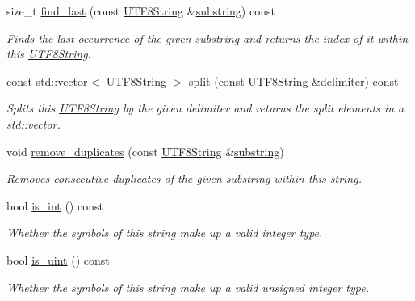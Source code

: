\begin{DoxyCompactItemize}
size\-\_\-t \hyperlink{classchaos_1_1uni_1_1_u_t_f8_string_a339b29461067299eebef2cd2a71278ee}{find\-\_\-last} (const \hyperlink{classchaos_1_1uni_1_1_u_t_f8_string}{U\-T\-F8\-String} \&\hyperlink{classchaos_1_1uni_1_1_u_t_f8_string_abfc2bac44a9be97d0d27e7b245a7df6e}{substring}) const 
\begin{DoxyCompactList}\small\item\em Finds the last occurrence of the given substring and returns the index of it within this \hyperlink{classchaos_1_1uni_1_1_u_t_f8_string}{U\-T\-F8\-String}. \end{DoxyCompactList}\item 
const std\-::vector$<$ \hyperlink{classchaos_1_1uni_1_1_u_t_f8_string}{U\-T\-F8\-String} $>$ \hyperlink{classchaos_1_1uni_1_1_u_t_f8_string_a7d9a171234e75c018c2a0824f77222e7}{split} (const \hyperlink{classchaos_1_1uni_1_1_u_t_f8_string}{U\-T\-F8\-String} \&delimiter) const 
\begin{DoxyCompactList}\small\item\em Splits this \hyperlink{classchaos_1_1uni_1_1_u_t_f8_string}{U\-T\-F8\-String} by the given delimiter and returns the split elements in a std\-::vector. \end{DoxyCompactList}\item 
void \hyperlink{classchaos_1_1uni_1_1_u_t_f8_string_a940e7ccc70fe1d6c486a5a89941dd2ef}{remove\-\_\-duplicates} (const \hyperlink{classchaos_1_1uni_1_1_u_t_f8_string}{U\-T\-F8\-String} \&\hyperlink{classchaos_1_1uni_1_1_u_t_f8_string_abfc2bac44a9be97d0d27e7b245a7df6e}{substring})
\begin{DoxyCompactList}\small\item\em Removes consecutive duplicates of the given substring within this string. \end{DoxyCompactList}\item 
bool \hyperlink{classchaos_1_1uni_1_1_u_t_f8_string_a758102d22056ad004660c49104526642}{is\-\_\-int} () const 
\begin{DoxyCompactList}\small\item\em Whether the symbols of this string make up a valid integer type. \end{DoxyCompactList}\item 
bool \hyperlink{classchaos_1_1uni_1_1_u_t_f8_string_a0df001bc19b6ee2a9e843f88b82dbfe1}{is\-\_\-uint} () const 
\begin{DoxyCompactList}\small\item\em Whether the symbols of this string make up a valid unsigned integer type. \end{DoxyCompactList}\item 

\end{DoxyCompactItemize}

